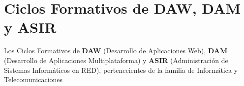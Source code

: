  \section{Ciclos Formativos de DAW, DAM y ASIR}
 Los Ciclos Formativos de {\bfseries DAW} (Desarrollo de Aplicaciones Web), {\bfseries DAM} (Desarrollo de Aplicaciones Multiplataforma) y {\bfseries ASIR} (Administración de Sistemas Informáticos en RED), pertenecientes de la familia de Informática y Telecomunicaciones
	



 

 
 
 
  
 

